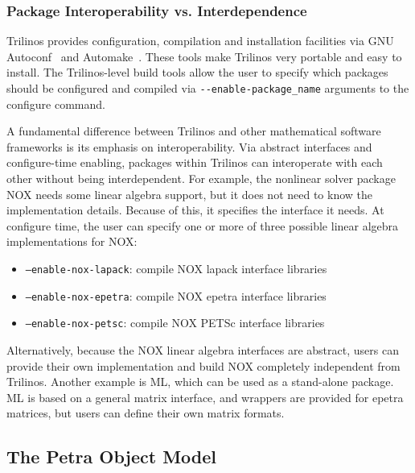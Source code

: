 \documentclass[]{llncs}      %
\begin{document}
\subsubsection*{Package Interoperability vs. Interdependence}

Trilinos provides configuration, compilation and installation facilities
via GNU Autoconf~\cite{4} and Automake~\cite{5}.  These tools make
Trilinos very portable and easy to install.  The Trilinos-level build
tools allow the user to specify which packages should be configured and
compiled via \verb!--enable-package_name! arguments to the configure command.

A fundamental difference between Trilinos and other mathematical
software frameworks is its emphasis on interoperability.  Via abstract
interfaces and configure-time enabling, packages within Trilinos can
interoperate with each other without being interdependent.  For example,
the nonlinear solver package NOX needs some linear algebra support, but
it does not need to know the implementation details.  Because of this,
it specifies the interface it needs.  At configure time, the user can
specify one or more of three possible linear algebra implementations for
NOX: 
\begin{itemize}
\item {\tt --enable-nox-lapack}:  compile NOX lapack interface libraries
\item {\tt --enable-nox-epetra}:  compile NOX epetra interface libraries
\item {\tt --enable-nox-petsc}:  compile NOX PETSc interface libraries
\end{itemize}
 Alternatively, because the NOX linear algebra interfaces are abstract,
users can provide their own implementation and build NOX completely
independent from Trilinos.  Another example is ML, which can be used as
a stand-alone package. ML is based on a general matrix interface, and
wrappers are provided for epetra matrices, but users can define their
own matrix formats.


\subsection*{The Petra Object Model}
\end{document}
